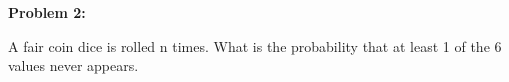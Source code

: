 \textbf{Problem 2:}

\singlespacing

A fair coin dice is rolled n times. What is the probability that at least 1 of the
6 values never appears.